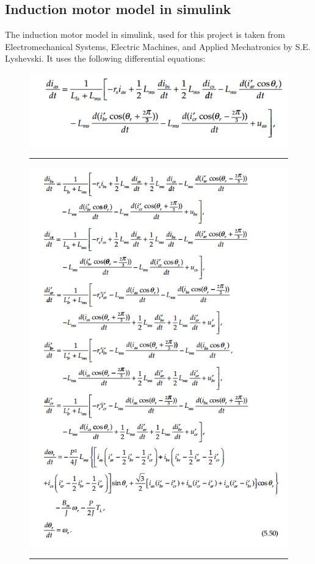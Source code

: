 \subsection{Induction motor model in simulink}
The induction motor model in simulink, used for this project is taken from Electromechanical Systems, Electric Machines, and Applied Mechatronics by  S.E. Lyshevski\cite{lyshevski2018electromechanical}. It uses the following differential equations:
\begin{figure}[!htbp]
	\centering
		\includegraphics[width = 4.5in]{./Figures/MS/eq23.png}
		\rule{35em}{0.5pt}
\end{figure}
\begin{figure}[!htbp]
	\centering
		\includegraphics[width = 4.5in]{./Figures/MS/eq24.png}
		\rule{35em}{0.5pt}
\end{figure}

